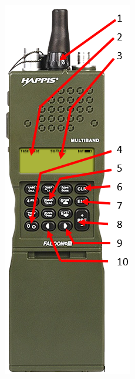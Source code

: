 	\begin{minipage}[t]{0.4\textwidth}
		\includegraphics[width=\textwidth]{./img/tutorials/tfar/TFAR_SR_Radio.png}
	\end{minipage}


